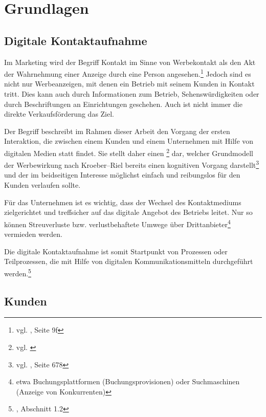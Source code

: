 
\section{Grundlagen} %
\label{sec:grundlagen}

\subsection{Digitale Kontaktaufnahme} %
\label{sub:digitale_kontaktaufnahme}

Im Marketing wird der Begriff Kontakt im Sinne von Werbekontakt als den Akt der Wahrnehmung einer Anzeige durch eine Person angesehen.\footnote{vgl. \cite{dannenberg}, Seite 9f} Jedoch sind es nicht nur Werbeanzeigen, mit denen ein Betrieb mit seinem Kunden in Kontakt tritt. Dies kann auch durch Informationen zum Betrieb, Sehenswürdigkeiten oder durch Beschriftungen an Einrichtungen geschehen. Auch ist nicht immer die direkte Verkaufsförderung das Ziel.

Der Begriff  beschreibt im Rahmen dieser Arbeit den Vorgang der ersten Interaktion, die zwischen einem Kunden und einem Unternehmen mit Hilfe von digitalen Medien statt findet. Sie stellt daher einen \footnote{vgl. \cite{gabler:medienbruch}} dar, welcher Grundmodell der Werbewirkung nach Kroeber–Riel bereits einen kognitiven Vorgang darstellt\footnote{vgl. \cite{kroeber-riel}, Seite 678} und der im beidseitigen Interesse möglichst einfach und reibungslos für den Kunden verlaufen sollte. 

Für das Unternehmen ist es wichtig, dass der Wechsel des Kontaktmediums zielgerichtet und treffsicher auf das digitale Angebot des Betriebs leitet. Nur so können Streuverluste bzw. verlustbehaftete Umwege über Drittanbieter\footnote{etwa Buchungsplattformen (Buchungsprovisionen) oder Suchmaschinen (Anzeige von Konkurrenten)} vermieden werden.

Die digitale Kontaktaufnahme ist somit Startpunkt von Prozessen oder Teilprozessen, die mit Hilfe von digitalen Kommunikationsmitteln durchgeführt werden.\footnote{\cite{magal}, Abschnitt 1.2}

\subsection{Kunden} %
\label{sub:kunden}

